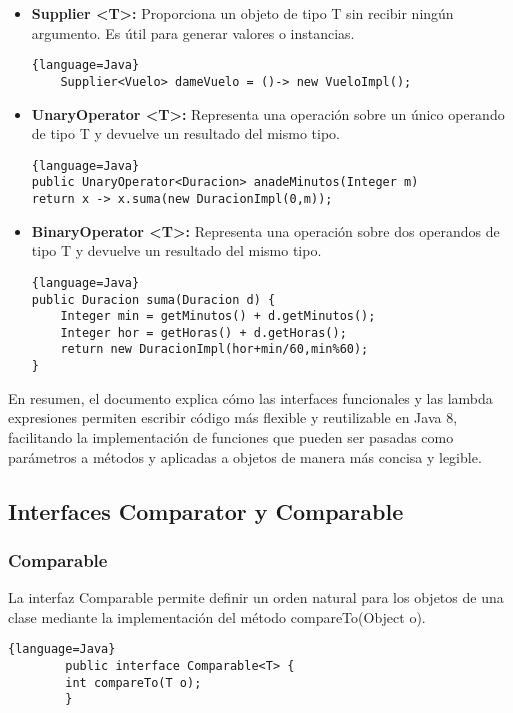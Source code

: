 \begin{center}
\begin{itemize}
		      \begin{lstlisting}{language=Java}
    BiConsumer<Vuelo, Fecha> setFecha = (x,y)->x.setFecha(y);
        \end{lstlisting}
		\item \textbf{Supplier <T>:}  Proporciona un objeto de tipo T sin recibir ningún argumento.
		      Es útil para generar valores o instancias.
		      \begin{lstlisting}{language=Java}
    Supplier<Vuelo> dameVuelo = ()-> new VueloImpl();
        \end{lstlisting}
		\item \textbf{UnaryOperator <T>:}  Representa una operación sobre un único operando de tipo
		      T y devuelve un resultado del mismo tipo.
		      \begin{lstlisting}{language=Java}
public UnaryOperator<Duracion> anadeMinutos(Integer m)
return x -> x.suma(new DuracionImpl(0,m));
        \end{lstlisting}
		\item \textbf{BinaryOperator <T>:}  Representa una operación sobre dos operandos de tipo T y devuelve
		      un resultado del mismo tipo.
		      \begin{lstlisting}{language=Java}
public Duracion suma(Duracion d) {
	Integer min = getMinutos() + d.getMinutos();
	Integer hor = getHoras() + d.getHoras();
	return new DuracionImpl(hor+min/60,min%60);
}
\end{lstlisting}
	\end{itemize}

	En resumen, el documento explica cómo las interfaces funcionales y las lambda expresiones permiten escribir código más
	flexible y reutilizable en Java 8, facilitando la implementación de funciones que pueden ser pasadas como parámetros a métodos
	y aplicadas a objetos de manera más concisa y legible.

	\subsection{Interfaces Comparator y Comparable}
	\subsubsection{Comparable}
	La interfaz Comparable permite definir un orden natural para los objetos de
	una clase mediante la implementación del método compareTo(Object o).
	\begin{lstlisting}{language=Java}
		public interface Comparable<T> {
		int compareTo(T o);
		}
	\end{lstlisting}

\end{center}
